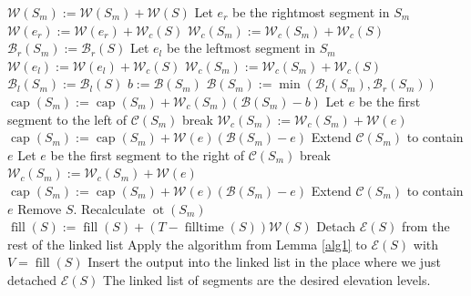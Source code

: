 \documentclass[11pt,a4paper]{article}
\DeclareMathOperator{\capp}{cap}
\DeclareMathOperator{\ot}{ot}
\DeclareMathOperator{\Fill}{fill}
\DeclareMathOperator{\filltime}{filltime}
\begin{document}
\begin{algorithmic}[1]
            \State $\mathcal{W}(S_m) := \mathcal{W}(S_m) + \mathcal{W}(S)$
              \State Let $e_r$ be the rightmost segment in $S_m$
              \State $\mathcal{W}(e_r) := \mathcal{W}(e_r) + \mathcal{W}_c(S)$
                \State $\mathcal{W}_c(S_m) := \mathcal{W}_c(S_m) + \mathcal{W}_c(S)$
              \EndIf
              \State $\mathcal{B}_r(S_m) := \mathcal{B}_r(S)$ \label{a2:bru}
            \Else
              \State Let $e_l$ be the leftmost segment in $S_m$
              \State $\mathcal{W}(e_l) := \mathcal{W}(e_l) + \mathcal{W}_c(S)$
                \State $\mathcal{W}_c(S_m) := \mathcal{W}_c(S_m) + \mathcal{W}_c(S)$
              \EndIf
              \State $\mathcal{B}_l(S_m) := \mathcal{B}_l(S)$ \label{a2:blu}
            \EndIf
            \State $b := \mathcal{B}(S_m)$
            \State $\mathcal{B}(S_m) := \min(\mathcal{B}_l(S_m), \mathcal{B}_r(S_m))$ \label{a2:bu}
              \State $\capp(S_m) := \capp(S_m) + \mathcal{W}_c(S_m)(\mathcal{B}(S_m) - b)$
                \State Let $e$ be the first segment to the left of $\mathcal{C}(S_m)$
                    \State break
                \EndIf
                \State $\mathcal{W}_c(S_m) := \mathcal{W}_c(S_m) + \mathcal{W}(e)$
                \State $\capp(S_m) := \capp(S_m) + \mathcal{W}(e)(\mathcal{B}(S_m) - e)$
                \State Extend $\mathcal{C}(S_m)$ to contain $e$
              \EndWhile
                \State Let $e$ be the first segment to the right of $\mathcal{C}(S_m)$
                    \State break
                \EndIf
                \State $\mathcal{W}_c(S_m) := \mathcal{W}_c(S_m) + \mathcal{W}(e)$
                \State $\capp(S_m) := \capp(S_m) + \mathcal{W}(e)(\mathcal{B}(S_m) - e)$
                \State Extend $\mathcal{C}(S_m)$ to contain $e$
              \EndWhile
            \EndIf
            \State Remove $S$.
            \State Recalculate $\ot(S_m)$
        \EndIf
    \EndWhile
      \State $\Fill(S) := \Fill(S) + (T - \filltime(S))\mathcal{W}(S)$
      \State Detach $\mathcal{E}(S)$ from the rest of the linked list
      \State Apply the algorithm from Lemma \ref{alg1} to $\mathcal{E}(S)$ with $V = \Fill(S)$
      \State Insert the output into the linked list in the place where we just detached $\mathcal{E}(S)$
    \EndFor
    \State The linked list of segments are the desired elevation levels.
\end{algorithmic}
\end{document}
